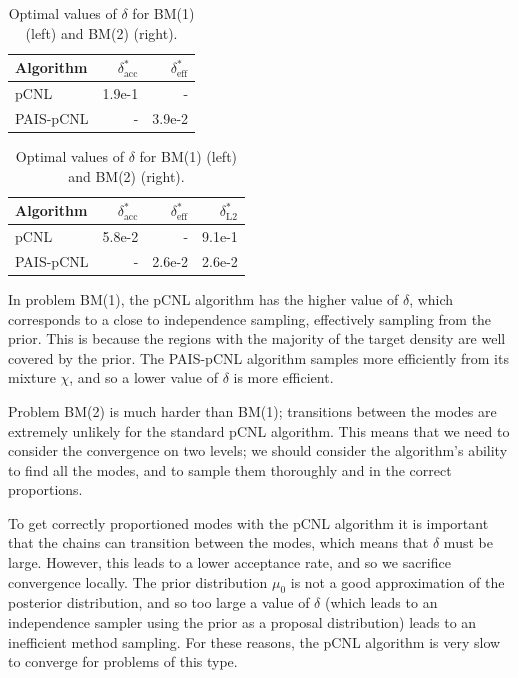 \documentclass[final]{siamltex}
\begin{document}
\begin{table}[!htb]
    \begin{minipage}{.5\linewidth}
      \centering
        \begin{tabular}{|l|r|r|}
	\hline
	Algorithm							& $\delta^*_{\text{acc}}$	& $\delta^*_{\text{eff}}$ \\ \hline
	pCNL								& 1.9e-1					& - \\
	PAIS-pCNL							& -						& 3.9e-2\\
	\hline
	\end{tabular}
    \end{minipage}%
    \begin{minipage}{.5\linewidth}
      \centering
        \begin{tabular}{|l|r|r|r|}
	\hline
	Algorithm							& $\delta^*_{\text{acc}}$	& $\delta^*_{\text{eff}}$	& $\delta^*_{\text{L2}}$ \\ \hline
	pCNL								& 5.8e-2					& - 						& 9.1e-1\\
	PAIS-pCNL							& -						& 2.6e-2 					& 2.6e-2\\
	\hline
	\end{tabular}
    \end{minipage}
	\caption{Optimal values of $\delta$ for BM(1) (left) and BM(2) (right).}
	\label{table:BM_opt_delta}
\end{table}

In problem BM(1), the pCNL algorithm has the
higher value of $\delta$, which corresponds to a close to independence
sampling, effectively sampling from the prior. This is because the
regions with the majority of the target density are well covered by
the prior. The PAIS-pCNL algorithm samples more efficiently from its
mixture $\chi$, and so a lower value of $\delta$ is more efficient.

Problem BM(2) is much harder than BM(1); transitions between the modes
are extremely unlikely for the standard pCNL algorithm. This means that we need to consider the
convergence on two levels; we should consider the algorithm's ability
to find all the modes, and to sample them thoroughly and in the correct proportions.

To get correctly proportioned modes with the pCNL algorithm it is
important that the chains can transition between the modes, which
means that $\delta$ must be large. However, this leads to a lower
acceptance rate, and so we sacrifice convergence locally. The prior distribution $\mu_0$ is
not a good approximation of the posterior distribution, and so too
large a value of $\delta$ (which leads to an independence sampler
using the prior as a proposal distribution) leads to an inefficient
method sampling. For these reasons, the pCNL algorithm is very slow to
converge for problems of this type.
\end{document}
